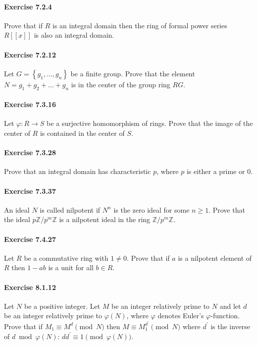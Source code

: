 \documentclass{article}
\begin{document}
\paragraph{Exercise 7.2.4} Prove that if $R$ is an integral domain then the ring of formal power series $R[[x]]$ is also an integral domain.

\paragraph{Exercise 7.2.12} Let $G=\left\{g_{1}, \ldots, g_{n}\right\}$ be a finite group. Prove that the element $N=g_{1}+g_{2}+\ldots+g_{n}$ is in the center of the group ring $R G$.

\paragraph{Exercise 7.3.16} Let $\varphi: R \rightarrow S$ be a surjective homomorphism of rings. Prove that the image of the center of $R$ is contained in the center of $S$.

\paragraph{Exercise 7.3.28} Prove that an integral domain has characteristic $p$, where $p$ is either a prime or 0.

\paragraph{Exercise 7.3.37} An ideal $N$ is called nilpotent if $N^{n}$ is the zero ideal for some $n \geq 1$. Prove that the ideal $p \mathbb{Z} / p^{m} \mathbb{Z}$ is a nilpotent ideal in the ring $\mathbb{Z} / p^{m} \mathbb{Z}$.

\paragraph{Exercise 7.4.27} Let $R$ be a commutative ring with $1 \neq 0$. Prove that if $a$ is a nilpotent element of $R$ then $1-a b$ is a unit for all $b \in R$.

\paragraph{Exercise 8.1.12} Let $N$ be a positive integer. Let $M$ be an integer relatively prime to $N$ and let $d$ be an integer relatively prime to $\varphi(N)$, where $\varphi$ denotes Euler's $\varphi$-function. Prove that if $M_{1} \equiv M^{d} \pmod N$ then $M \equiv M_{1}^{d^{\prime}} \pmod N$ where $d^{\prime}$ is the inverse of $d \bmod \varphi(N)$: $d d^{\prime} \equiv 1 \pmod {\varphi(N)}$.
\end{document}
